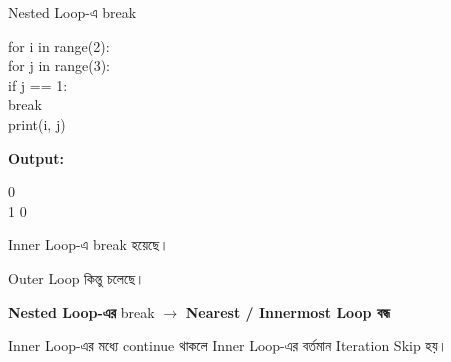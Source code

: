 \begin{codeoutputbox}{Nested Loop-এ \textenglish{\ttfamily break}}

\noindent
\begin{minipage}[t]{0.55\linewidth}
\codeheading

\begin{english}
\ttfamily
for i in range(2):\\
\hspace*{4mm}for j in range(3):\\
\hspace*{8mm}if j == 1:\\
\hspace*{12mm}break\\
\hspace*{8mm}print(i, j)
\end{english}

\end{minipage}
\hfill
\begin{minipage}[t]{0.41\linewidth}
\outputheading

\textbf{Output:}

\begin{english}
 0\\
1 0
\end{english}

\medskip

Inner Loop-এ
\textenglish{\ttfamily break}
হয়েছে।

Outer Loop কিন্তু চলেছে।

\end{minipage}

\end{codeoutputbox}

\begin{rememberbox}

\begin{center}

\textbf{Nested Loop-এর}
\textenglish{\ttfamily break}
\(\longrightarrow\)
\textbf{Nearest / Innermost Loop বন্ধ}

\end{center}

\end{rememberbox}



Inner Loop-এর মধ্যে
\textenglish{\ttfamily continue}
থাকলে Inner Loop-এর বর্তমান Iteration Skip হয়।

